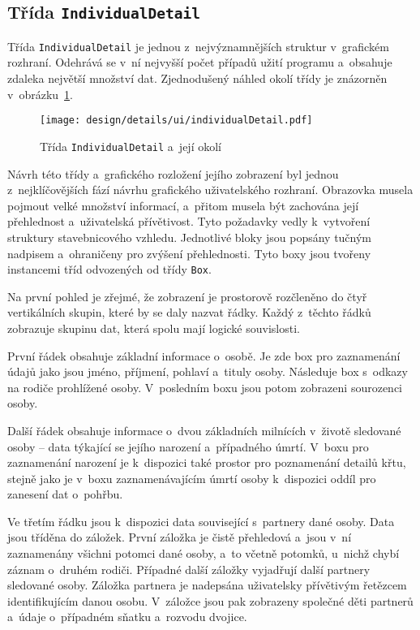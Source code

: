 		\subsection*{Třída \texttt{IndividualDetail}}
		Třída \texttt{IndividualDetail} je jednou z~nejvýznamnějších struktur v~grafickém rozhraní. Odehrává se v~ní nejvyšší počet případů užití programu a~obsahuje zdaleka největší množství dat. Zjednodušený náhled okolí třídy je znázorněn v~obrázku~\ref{fig:designDetailIndividualDetail}.\par
		\begin{figure}[t!]
			\centering
			\texttt{[image: design/details/ui/individualDetail.pdf]}
			\caption{Třída \texttt{IndividualDetail} a~její okolí}
			\label{fig:designDetailIndividualDetail}
		\end{figure}
		Návrh této třídy a~grafického rozložení jejího zobrazení byl jednou z~nejklíčovějších fází návrhu grafického uživatelského rozhraní. Obrazovka musela pojmout velké množství informací, a~přitom musela být zachována její přehlednost a~uživatelská přívětivost. Tyto požadavky vedly k~vytvoření struktury stavebnicového vzhledu. Jednotlivé bloky jsou popsány tučným nadpisem a~ohraničeny pro zvýšení přehlednosti. Tyto boxy jsou tvořeny instancemi tříd odvozených od třídy \texttt{Box}.\par
		Na první pohled je zřejmé, že zobrazení je prostorově rozčleněno do čtyř vertikálních skupin, které by se daly nazvat řádky. Každý z~těchto řádků zobrazuje skupinu dat, která spolu mají logické souvislosti. \par
		První řádek obsahuje základní informace o~osobě. Je zde box pro zaznamenání údajů jako jsou jméno, příjmení, pohlaví a~tituly osoby. Následuje box s~odkazy na rodiče prohlížené osoby. V~posledním boxu jsou potom zobrazeni sourozenci osoby. \par
		Další řádek obsahuje informace o~dvou základních milnících v~životě sledované osoby -- data týkající se jejího narození a~případného úmrtí. V~boxu pro zaznamenání narození je k~dispozici také prostor pro poznamenání detailů křtu, stejně jako je v~boxu zaznamenávajícím úmrtí osoby k~dispozici oddíl pro zanesení dat o~pohřbu.\par
		Ve třetím řádku jsou k~dispozici data související s~partnery dané osoby. Data jsou tříděna do záložek. První záložka je čistě přehledová a~jsou v~ní zaznamenány všichni potomci dané osoby, a~to včetně potomků, u~nichž chybí záznam o~druhém rodiči. Případné další záložky vyjadřují další partnery sledované osoby. Záložka partnera je nadepsána uživatelsky přívětivým řetězcem identifikujícím danou osobu. V~záložce jsou pak zobrazeny společné děti partnerů a~údaje o~případném sňatku a~rozvodu dvojice.\par
